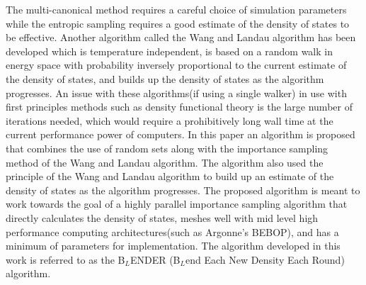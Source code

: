 \documentclass[aps,pre,reprint,superscriptaddress,showkeys]{revtex4-2}
\begin{document}
The multi-canonical method requires a careful choice of simulation parameters while the entropic sampling requires a good estimate of the density of states to be effective.  Another algorithm called the  Wang and Landau algorithm \cite{WL_phys_rev_lett,Wang_Landau_phys_rev_E} has been developed which is temperature independent, is based on a random walk in energy space with probability inversely proportional to the current estimate of the  density of states, and builds up the  density of states as the algorithm progresses.  An issue with these algorithms(if using a single walker) in use with first principles methods such as density functional theory is the large number of iterations needed, which would require a prohibitively long wall time at the current performance power of computers.  In this paper an algorithm is proposed that combines the use of random sets along with the importance sampling method of the Wang and Landau algorithm. The algorithm also used the principle of the Wang and Landau algorithm to build up an estimate of the  density of states as the algorithm progresses.  The proposed algorithm is meant to work towards the goal of a highly parallel importance sampling algorithm that directly calculates the  density of states, meshes well with mid level high performance computing architectures(such as Argonne's BEBOP), and has a minimum of parameters for implementation. The algorithm developed in this work is referred to as the B$_{L}$ENDER (B$_{L}$end Each New Density Each Round) algorithm.
 
\end{document}
